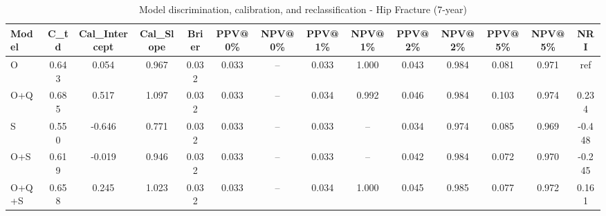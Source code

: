 \begin{table}[htbp]
\centering
\small
\caption{Model discrimination, calibration, and reclassification - Hip Fracture (7-year)}
\label{tab:perf_pd_7y}
\begin{tabular}{lccccccccccccc}
\toprule
Model & C\_td & Cal\_Intercept & Cal\_Slope & Brier & PPV@0\% & NPV@0\% & PPV@1\% & NPV@1\% & PPV@2\% & NPV@2\% & PPV@5\% & NPV@5\% & NRI \\
\midrule
O & 0.643 & 0.054 & 0.967 & 0.032 & 0.033 & -- & 0.033 & 1.000 & 0.043 & 0.984 & 0.081 & 0.971 & ref \\
O+Q & 0.685 & 0.517 & 1.097 & 0.032 & 0.033 & -- & 0.034 & 0.992 & 0.046 & 0.984 & 0.103 & 0.974 & 0.234 \\
S & 0.550 & -0.646 & 0.771 & 0.032 & 0.033 & -- & 0.033 & -- & 0.034 & 0.974 & 0.085 & 0.969 & -0.448 \\
O+S & 0.619 & -0.019 & 0.946 & 0.032 & 0.033 & -- & 0.033 & -- & 0.042 & 0.984 & 0.072 & 0.970 & -0.245 \\
O+Q+S & 0.658 & 0.245 & 1.023 & 0.032 & 0.033 & -- & 0.034 & 1.000 & 0.045 & 0.985 & 0.077 & 0.972 & 0.161 \\
\bottomrule
\end{tabular}
\end{table}